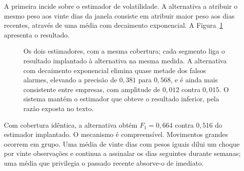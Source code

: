 A primeira incide sobre o estimador de volatilidade. A alternativa a atribuir o mesmo peso aos vinte
dias da janela consiste em atribuir maior peso aos dias recentes, através de uma média com
decaimento exponencial. A Figura~\ref{fig:av_ewma} apresenta o resultado.

\begin{figure}[ht]
\centering
{}
\caption[Dois estimadores de volatilidade sobre o mesmo protocolo]{Os dois estimadores, com a mesma
cobertura; cada segmento liga o resultado implantado à alternativa na mesma medida. A alternativa
com decaimento exponencial elimina quase metade dos falsos alarmes,
elevando a precisão de $0{,}381$ para $0{,}568$, e é ainda mais consistente entre empresas, com
amplitude de $0{,}012$ contra $0{,}015$. O sistema mantém o estimador que obteve o resultado
inferior, pela razão exposta no texto.}
\label{fig:av_ewma}
\end{figure}

Com cobertura idêntica, a alternativa obtém $F_1 = 0{,}664$ contra $0{,}516$ do estimador
implantado. O mecanismo é compreensível. Movimentos grandes ocorrem em grupo. Uma média de vinte dias com
pesos iguais dilui um choque por vinte observações e continua a assinalar os dias seguintes
durante semanas; uma média que privilegia o passado recente absorve-o de imediato.


